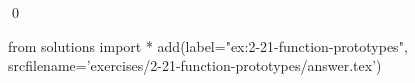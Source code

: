 
\begin{ex}
  \label{ex:2-21-function-prototypes}
  
  \qed
\end{ex}
\begin{python0}
from solutions import *
add(label="ex:2-21-function-prototypes",
    srcfilename='exercises/2-21-function-prototypes/answer.tex')
\end{python0}
